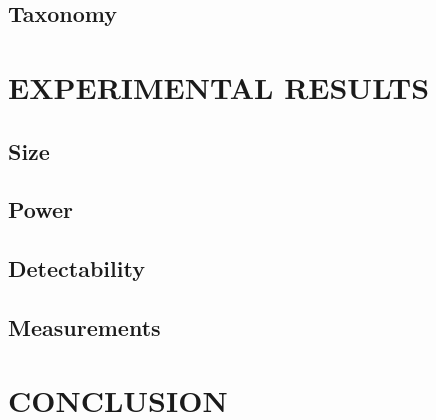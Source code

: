 \documentclass[letterpaper, 10 pt, conference]{ieeeconf}  %
\begin{document}
\subsection{Taxonomy}
  
\section{EXPERIMENTAL RESULTS}

\subsection{Size}

\subsection{Power}

\subsection{Detectability}

\subsection{Measurements} 

\section{CONCLUSION}


\addtolength{\textheight}{-12cm}   %







\end{document}
